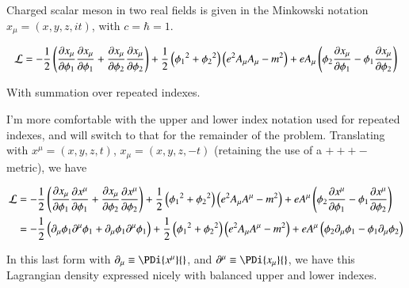 \documentclass{article}
\begin{document}
Charged scalar meson in two real fields is given in the Minkowski notation $x_\mu = (x,y,z,it)$, with $c = \hbar = 1$.

\begin{align}
\mathcal{L} = -\frac{1}{2}\left( 
\frac{\partial{x_\mu}}{\partial {\phi_1}} \frac{\partial{x_\mu}}{\partial {\phi_1}} 
+ \frac{\partial{x_\mu}}{\partial {\phi_2}} \frac{\partial{x_\mu}}{\partial {\phi_2}} 
\right)
+ \frac{1}{2}
\left( 
{\phi_1}^2 
+ {\phi_2}^2 
\right)
\left( e^2 A_\mu A_\mu - m^2 \right) 
+ e A_\mu \left(
\phi_2 \frac{\partial{x_\mu}}{\partial {\phi_1}}
-\phi_1 \frac{\partial{x_\mu}}{\partial {\phi_2}}
\right)
\end{align}

With summation over repeated indexes.

I'm more comfortable with the upper and lower index notation used for repeated indexes, and will switch to that for the remainder
of the problem.  Translating with $x^\mu = (x,y,z,t)$, $x_\mu = (x,y,z,-t)$ (retaining the use of a $+++-$ metric), we have

\begin{align}
\mathcal{L} 
&= -\frac{1}{2}\left( 
\frac{\partial{x_\mu}}{\partial {\phi_1}} \frac{\partial{x^\mu}}{\partial {\phi_1}} 
+ \frac{\partial{x_\mu}}{\partial {\phi_2}} \frac{\partial{x^\mu}}{\partial {\phi_2}} 
\right)
+ \frac{1}{2}
\left( 
{\phi_1}^2 
+ {\phi_2}^2 
\right)
\left( e^2 A_\mu A^\mu - m^2 \right) 
+ e A^\mu \left(
\phi_2 \frac{\partial{x^\mu}}{\partial {\phi_1}}
-\phi_1 \frac{\partial{x^\mu}}{\partial {\phi_2}}
\right) \\
&= -\frac{1}{2}\left( 
\partial_\mu \phi_1 \partial^\mu \phi_1
+\partial_\mu \phi_1 \partial^\mu \phi_1
\right)
+ \frac{1}{2}
\left( 
{\phi_1}^2 
+ {\phi_2}^2 
\right)
\left( e^2 A_\mu A^\mu - m^2 \right) 
+ e A^\mu \left(
\phi_2 \partial_\mu {\phi_1}
-\phi_1 \partial_\mu {\phi_2}
\right) 
\end{align}

In this last form with $\partial_\mu \equiv \PDi{x^\mu}{}$, and $\partial^\mu \equiv \PDi{x_\mu}{}$, we have this Lagrangian density expressed nicely with
balanced upper and lower indexes.

%

\end{document}
